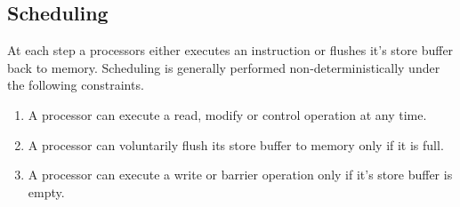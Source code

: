 \subsection{Scheduling}

At each step a processors either executes an instruction or flushes it's store buffer back to memory.
Scheduling is generally performed non-deterministically under the following constraints.

\begin{enumerate}
  \item A processor can execute a read, modify or control operation at any time.
  \item A processor can voluntarily flush its store buffer to memory only if it is full.
  \item A processor can execute a write or barrier operation only if it's store buffer is empty.
\end{enumerate}

